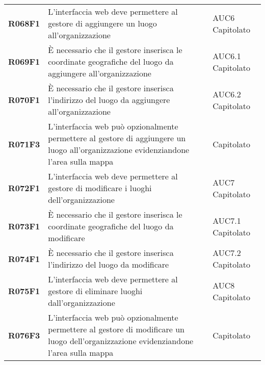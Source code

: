 \documentclass[../analisi-dei-requisiti.tex]{subfiles}
\begin{document}
\begin{longtable}[H]{>{\centering\bfseries}m{3cm} >{\centering}m{10cm} >{\centering\arraybackslash}m{3cm}}
  R068F1                               & L'interfaccia web deve permettere al gestore di aggiungere un luogo all'organizzazione                                                                                                                  & AUC6 Capitolato               \\
  R069F1                               & È necessario che il gestore inserisca le coordinate geografiche del luogo da aggiungere all'organizzazione                                                                                              & AUC6.1 Capitolato             \\
  R070F1                               & È necessario che il gestore inserisca l'indirizzo del luogo da aggiungere all'organizzazione                                                                                                            & AUC6.2 Capitolato             \\
  R071F3                               & L'interfaccia web può opzionalmente permettere al gestore di aggiungere un luogo all'organizzazione evidenziandone l'area sulla mappa                                                                   & Capitolato                    \\
  R072F1                               & L'interfaccia web deve permettere al gestore di modificare i luoghi dell'organizzazione                                                                                                                 & AUC7 Capitolato               \\
  R073F1                               & È necessario che il gestore inserisca le coordinate geografiche del luogo da modificare                                                                                                                 & AUC7.1 Capitolato             \\
  R074F1                               & È necessario che il gestore inserisca l'indirizzo del luogo da modificare                                                                                                                               & AUC7.2 Capitolato             \\
  R075F1                               & L'interfaccia web deve permettere al gestore di eliminare luoghi dall'organizzazione                                                                                                                    & AUC8 Capitolato               \\
  R076F3                               & L'interfaccia web può opzionalmente permettere al gestore di modificare un luogo dell'organizzazione evidenziandone l'area sulla mappa                                                                  & Capitolato                    \\

\end{longtable}
\end{document}
